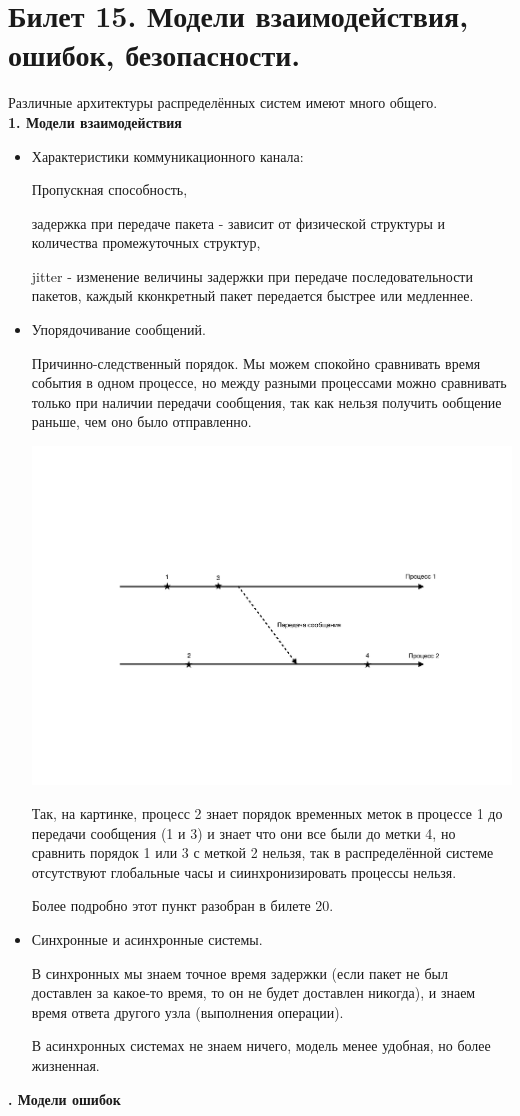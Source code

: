 \newpage
\section {Билет 15. Модели взаимодействия, ошибок, безопасности.}

Различные архитектуры распределённых систем имеют много общего.\\
\textbf{1. Модели взаимодействия}
\begin{itemize}
\item Характеристики коммуникационного канала:

Пропускная способность, 

задержка при передаче пакета - зависит от физической структуры и количества промежуточных структур, 

jitter - изменение величины задержки при передаче последовательности пакетов, каждый кконкретный пакет передается быстрее или медленнее. 

\item Упорядочивание сообщений.

Причинно-следственный порядок. Мы можем спокойно сравнивать время события в одном процессе, но между разными процессами можно сравнивать только при наличии передачи сообщения, так как нельзя получить ообщение раньше, чем оно было отправленно.

\includegraphics[scale=0.7]{15/masseg_time.pdf}

Так, на картинке, процесс 2 знает порядок временных меток в процессе 1 до передачи сообщения (1 и 3) и знает что они все были до метки 4, но сравнить порядок 1 или 3 с меткой 2 нельзя, так в распределённой системе отсутствуют глобальные часы и сиинхронизировать процессы нельзя.
 
 Более подробно этот пункт разобран в билете 20.
 
\item  Синхронные и асинхронные системы.

В синхронных мы знаем точное время задержки (если пакет не был доставлен за какое-то время, то он не будет доставлен никогда), и знаем время ответа другого узла (выполнения операции).

В асинхронных системах не знаем ничего, модель менее удобная, но более жизненная.
\end{itemize} 
\textbf{. Модели ошибок}

